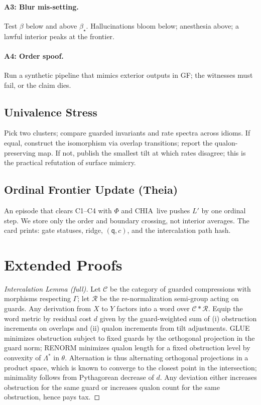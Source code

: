 \documentclass[11pt]{article}
\newcommand{\1}{\mathbf{1}}
\newcommand{\Guard}{\Gamma}
\newcommand{\Blur}{\beta}
\newcommand{\PhiField}{\Phi}
\newcommand{\Qualon}{\mathsf{q}}        %
\newcommand{\CHIA}{\textsc{CHIA}}
\begin{document}
\paragraph{A3: Blur mis-setting.}
Test $\beta$ below and above $\Blur_\star$. Hallucinations bloom below; anesthesia above; a lawful interior peaks at the frontier.

\paragraph{A4: Order spoof.}
Run a synthetic pipeline that mimics exterior outputs in GF; the witnesses must fail, or the claim dies.

\subsection{Univalence Stress}
Pick two clusters; compare guarded invariants and rate spectra across idioms. If equal, construct the isomorphism via overlap transitions; report the qualon-preserving map. If not, publish the smallest tilt at which rates disagree; this is the practical refutation of surface mimicry.

\subsection{Ordinal Frontier Update (Theia)}
An episode that clears C1–C4 with $\PhiField$ and \CHIA\ live pushes $L'$ by one ordinal step. We store only the order and boundary crossing, not interior averages. The card prints: gate statuses, ridge, $(\Qualon,c)$, and the intercalation path hash.

\section{Extended Proofs}

\begin{proof}[Intercalation Lemma (full)]
Let $\mathcal{C}$ be the category of guarded compressions with morphisms respecting $\Guard$; let $\mathcal{R}$ be the re-normalization semi-group acting on guards. Any derivation from $X$ to $Y$ factors into a word over $\mathcal{C}\ast\mathcal{R}$. Equip the word metric by residual cost $d$ given by the guard-weighted sum of (i) obstruction increments on overlaps and (ii) qualon increments from tilt adjustments. GLUE minimizes obstruction subject to fixed guards by the orthogonal projection in the guard norm; RENORM minimizes qualon length for a fixed obstruction level by convexity of $\Lambda^\ast$ in $\theta$. Alternation is thus alternating orthogonal projections in a product space, which is known to converge to the closest point in the intersection; minimality follows from Pythagorean decrease of $d$. Any deviation either increases obstruction for the same guard or increases qualon count for the same obstruction, hence pays tax.
\end{proof}
\end{document}
